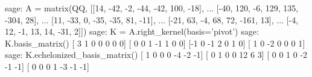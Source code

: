 %
\begin{sageexample}
sage: A = matrix(QQ, [[14, -42, -2, -44, -42, 100, -18],
...                   [-40, 120, -6, 129, 135, -304, 28],
...                   [11, -33, 0, -35, -35, 81, -11],
...                   [-21, 63, -4, 68, 72, -161, 13],
...                   [-4, 12, -1, 13, 14, -31, 2]])
sage: K = A.right_kernel(basis='pivot')
sage: K.basis_matrix()
[ 3  1  0  0  0  0  0]
[ 0  0  1 -1  1  0  0]
[-1  0 -1  2  0  1  0]
[ 1  0 -2  0  0  0  1]
sage: K.echelonized_basis_matrix()
[ 1  0  0  0 -4 -2 -1]
[ 0  1  0  0 12  6  3]
[ 0  0  1  0 -2 -1 -1]
[ 0  0  0  1 -3 -1 -1]
\end{sageexample}
%
\begin{sageverbatim}
\end{sageverbatim}
%
